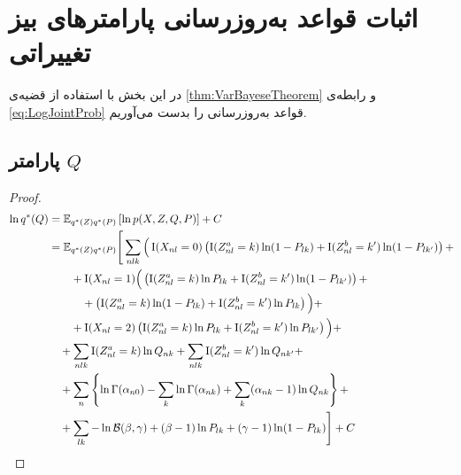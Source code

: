 ﻿%

\section{اثبات قواعد به‌روزرسانی پارامترهای بیز تغییراتی}
\label{app:VBUpdatingRules}


در این بخش با استفاده از قضیه‌ی
\ref{thm:VarBayeseTheorem}
و رابطه‌ی
\eqref{eq:LogJointProb}
قواعد به‌روز‌رسانی را بدست می‌آوریم.


\subsection{پارامتر
$Q$}

\begin{proof}
\begin{align*}
\ln \StarProb{Q} &= \Exp{\StarProb{Z} \StarProb{P}}{\ln \TrueProb{X, Z, Q, P}} + C
\\ %
	&= \mathbb{E}_{\StarProb{Z} \StarProb{P}} \Bigg[ \sum_{nlk} \Big( \Big.
		\Indic{X_{nl} = 0} \left( \Indic{Z_{nl}^a = k} \ln (1 - P_{lk})
				+ \Indic{Z_{nl}^b = k'} \ln (1 - P_{lk'}) \right) +												\nonumber \\
			& \qquad + \Indic{X_{nl} = 1} \Big(
				\left( \Indic{Z_{nl}^a=k} \ln P_{lk} + \Indic{Z_{nl}^b=k'} \ln (1 - P_{lk'}) \right) +			\nonumber \\
			& \qquad \quad + \left( \Indic{Z_{nl}^a=k} \ln (1 - P_{lk}) + \Indic{Z_{nl}^b=k'} \ln P_{lk} \right)
			\Big) +																								\nonumber \\
			& \qquad + \Indic{X_{nl} = 2} \left( \Indic{Z_{nl}^a = k} \ln P_{lk}
				+ \Indic{Z_{nl}^b = k'} \ln P_{lk'} \right)
	\Big. \Big) +
\nonumber \\ %
		& \quad + \sum_{nlk} \Indic{Z_{nl}^a = k} \ln Q_{nk}
			+ \sum_{nlk} \Indic{Z_{nl}^b = k'} \ln Q_{nk'} +
\nonumber \\ %
		& \quad + \sum_n \left\{
			\ln \GammaFunc{\alpha_{n0}}
			- \sum_{k} \ln \GammaFunc{\alpha_{nk}}
			+ \sum_{k} (\alpha_{nk} - 1) \ln Q_{nk}
		\right\} +
\nonumber \\ %
		& \quad + \sum_{lk} - \ln \BetaFunc{\beta}{\gamma}
		+ (\beta - 1) \ln P_{lk}
		+ (\gamma - 1) \ln (1 - P_{lk})
	\Bigg] + C
\\ %

\end{align*}
\end{proof}
